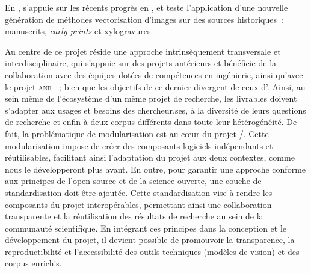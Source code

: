 En \cv, \eida s'appuie sur les récents progrès en
\dl, et teste l'application d'une nouvelle génération de
méthodes vectorisation d'images sur des sources
historiques~: manuscrits, \emph{early prints} et xylogravures.

Au centre de ce projet réside une approche intrinsèquement transversale
et interdisciplinaire, qui s'appuie sur des projets antérieurs et
bénéficie de la collaboration avec des équipes dotées de compétences en
ingénierie, ainsi qu'avec le projet \textsc{anr} \vhs~; bien que les objectifs de
ce dernier divergent de ceux d'\eida. Ainsi, au sein même de l'écosystème
d'un même projet de recherche, les livrables doivent s'adapter aux
usages et besoins des chercheur.ses, à la diversité de leurs questions de
recherche et enfin à deux corpus différents dans toute leur
hétérogénéité. De fait, la problématique de modularisation est au cœur
du projet \vhs/\eida. Cette modularisation impose de créer des composants
logiciels indépendants et réutilisables, facilitant ainsi l'adaptation
du projet aux deux contextes, comme nous le développeront plus avant. En
outre, pour garantir une approche conforme aux principes de l'open-source et de la science ouverte, une couche de standardisation doit être
ajoutée. Cette standardisation vise à rendre les composants du projet
interopérables, permettant ainsi une collaboration transparente et la
réutilisation des résultats de recherche au sein de la communauté
scientifique. En intégrant ces principes dans la conception et le
développement du projet, il devient possible de promouvoir la
transparence, la reproductibilité et l'accessibilité des outils
techniques (modèles de vision) et des corpus enrichis.
